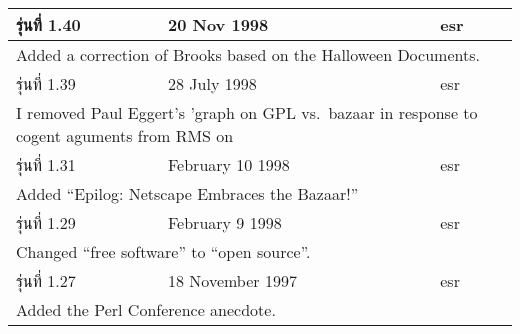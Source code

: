 {\begin{tabular*}{\textwidth}{|l|l|l|}
    รุ่นที่ 1.40 & 20 Nov 1998       & esr                                                                                                                                                                           \\  \hline
    \multicolumn{3}{|p{.963\textwidth}|}{Added a correction of Brooks based on the Halloween Documents.}                                                                                                             \\ \hline
    รุ่นที่ 1.39 & 28 July 1998      & esr                                                                                                                                                                           \\  \hline
    \multicolumn{3}{|p{.963\textwidth}|}{I removed Paul Eggert's 'graph on GPL vs.~bazaar in response to cogent aguments from RMS on}                                                                                \\ \hline
    รุ่นที่ 1.31 & February 10 1998  & esr                                                                                                                                                                           \\  \hline
    \multicolumn{3}{|p{.963\textwidth}|}{Added ``Epilog: Netscape Embraces the Bazaar!''}                                                                                                                            \\ \hline
    รุ่นที่ 1.29 & February 9 1998   & esr                                                                                                                                                                           \\  \hline
    \multicolumn{3}{|p{.963\textwidth}|}{Changed ``free software'' to ``open source''.}                                                                                                                              \\ \hline
    รุ่นที่ 1.27 & 18 November 1997  & esr                                                                                                                                                                           \\  \hline
    \multicolumn{3}{|p{.963\textwidth}|}{Added the Perl Conference anecdote.}                                                                                                                                        \\ \hline

\end{tabular*}}

